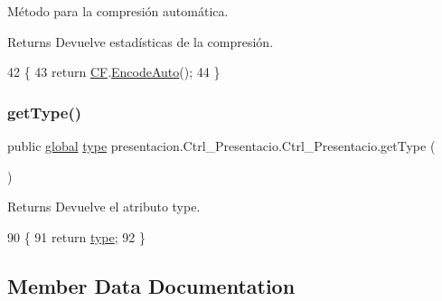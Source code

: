 Método para la compresión automática. 

\begin{DoxyReturn}{Returns}
Devuelve estadísticas de la compresión. 
\end{DoxyReturn}

\begin{DoxyCode}
42                                \{
43         \textcolor{keywordflow}{return} \hyperlink{classpresentacion_1_1Ctrl__Presentacio_1_1Ctrl__Presentacio_af46ef2ef420276ff830c2f0ff8c1a7e6}{CF}.\hyperlink{classdomini_1_1folders_1_1Ctrl__FolderFile_aa88b27fc271590c8c16642db5c1bb329}{EncodeAuto}();
44     \}
\end{DoxyCode}
\mbox{\label{classpresentacion_1_1Ctrl__Presentacio_1_1Ctrl__Presentacio_a029db5d77bf1e81be0811816a74d81a0}} 
\subsubsection{\texorpdfstring{get\+Type()}{getType()}}
{\footnotesize\ttfamily public \hyperlink{classglobal_1_1global}{global} \hyperlink{classpresentacion_1_1Ctrl__Presentacio_1_1Ctrl__Presentacio_af72267ee1302df6b5982c3248d5a19b0}{type} presentacion.\+Ctrl\+\_\+\+Presentacio.\+Ctrl\+\_\+\+Presentacio.\+get\+Type (\begin{DoxyParamCaption}{ }\end{DoxyParamCaption})\hspace{0.3cm}{\ttfamily [inline]}}

\begin{DoxyReturn}{Returns}
Devuelve el atributo type. 
\end{DoxyReturn}

\begin{DoxyCode}
90     \{
91         \textcolor{keywordflow}{return} \hyperlink{classpresentacion_1_1Ctrl__Presentacio_1_1Ctrl__Presentacio_af72267ee1302df6b5982c3248d5a19b0}{type};
92     \}
\end{DoxyCode}


\subsection{Member Data Documentation}
\mbox{\label{classpresentacion_1_1Ctrl__Presentacio_1_1Ctrl__Presentacio_af46ef2ef420276ff830c2f0ff8c1a7e6}} 
